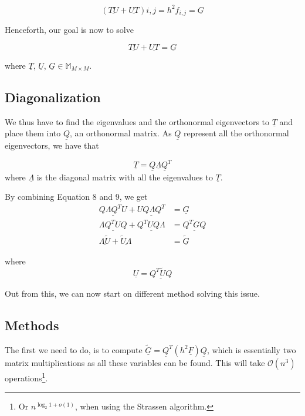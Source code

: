 \begin{equation}
  (\underline{TU} + \underline{UT})i,j = h^2f_{i,j} = \underline{G}
\end{equation}

Henceforth, our goal is now to solve

\begin{equation}
  \underline{TU} + \underline{UT} = \underline G
\end{equation}

where $\underline T$, $\underline U$, $\underline G \in \mathbb{M}_{M\times M}$.

\subsection{Diagonalization}

We thus have to find the eigenvalues and the orthonormal eigenvectors to
$\underline T$ and place them into $\underline Q$, an orthonormal matrix. As
$\underline Q$ represent all the orthonormal eigenvectors, we have that

\begin{equation}
  \underline T = \underline Q \underline \Lambda \underline Q^T
\end{equation}
where $\underline \Lambda$ is the diagonal matrix with all the eigenvalues to
$\underline T$.

By combining Equation 8 and 9, we get
\begin{align}
  \underline {Q \Lambda Q^T U} + \underline {U Q \Lambda Q^T} &= \underline G \\
  \underline {\Lambda Q^T U Q} + \underline {Q^T U Q \Lambda} &= \underline{Q^T
    G Q} \\
  \underline {\Lambda \tilde{U}} + \underline {\tilde{U} \Lambda} &= \underline{\tilde{G}}
\end{align}

where
\begin{equation}
  \underline U = \underline{Q^T \tilde{U} Q}
\end{equation}

Out from this, we can now start on different method solving this issue.

\subsection{Methods}

The first we need to do, is to compute $\underline{\tilde{G}} = \underline Q^T
(h^2 \underline F) \underline Q$, which is essentially two matrix
multiplications as all these variables can be found. This will take
$\mathcal{O}(n^3)$ operations\footnote{Or $n^{\log_2 1 + o(1)}$, when using
  the Strassen algorithm.}.

